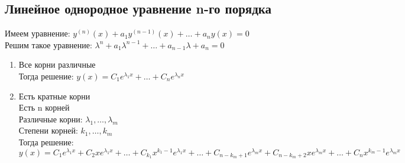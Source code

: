 \documentclass{article}
\begin{document}
\subsection{Линейное однородное уравнение n-го порядка}
\label{sec:org85040b1}
Имеем уравнение: \(y^{(n)}(x) + a_1y^{(n - 1)}(x) + \dots + a_ny(x) = 0\) \\
Решим такое уравнение: \(\lambda^n + a_1\lambda^{n - 1} + \dots + a_{n-1}\lambda + a_n = 0\) \\
\begin{enumerate}
\item Все корни различные \\
Тогда решение: \(y(x) = C_1e^{\lambda_1x} + \dots + C_ne^{\lambda_nx}\)
\item Есть кратные корни \\
Есть n корней \\
Различные корни: \(\lambda_1, \dots, \lambda_m\) \\
Степени корней: \(k_1, \dots, k_m\) \\
Тогда решение: 
\[ y(x) = C_1e^{\lambda_1x} + C_2xe^{\lambda_1x} + \dots + C_{k_1}x^{k_1 - 1}e^{\lambda_1x} + \dots + C_{n - k_m + 1}e^{\lambda_mx} + C_{n - k_m + 2}xe^{\lambda_mx} + \dots + C_{n}x^{k_m - 1}e^{\lambda_mx}\]
\end{enumerate}
\end{document}
